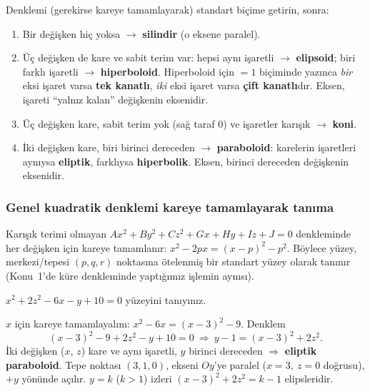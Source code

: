 \begin{teorem}
Denklemi (gerekirse kareye tamamlayarak) standart biçime getirin, sonra:
\begin{enumerate}
  \item Bir değişken hiç yoksa $\to$ \textbf{silindir} (o eksene paralel).
  \item Üç değişken de kare ve sabit terim var: hepsi aynı işaretli $\to$ \textbf{elipsoid}; biri farklı işaretli $\to$ \textbf{hiperboloid}. Hiperboloid için $=1$ biçiminde yazınca \emph{bir} eksi işaret varsa \textbf{tek kanatlı}, \emph{iki} eksi işaret varsa \textbf{çift kanatlı}dır. Eksen, işareti ``yalnız kalan'' değişkenin eksenidir.
  \item Üç değişken kare, sabit terim yok (sağ taraf $0$) ve işaretler karışık $\to$ \textbf{koni}.
  \item İki değişken kare, biri birinci dereceden $\to$ \textbf{paraboloid}: karelerin işaretleri aynıysa \textbf{eliptik}, farklıysa \textbf{hiperbolik}. Eksen, birinci dereceden değişkenin eksenidir.
\end{enumerate}
\end{teorem}

\subsubsection{Genel kuadratik denklemi kareye tamamlayarak tanıma}

\begin{bilgi}
Karışık terimi olmayan $Ax^2+By^2+Cz^2+Gx+Hy+Iz+J=0$ denkleminde her değişken için kareye tamamlanır: $x^2-2px=(x-p)^2-p^2$. Böylece yüzey, merkezi/tepesi $(p,q,r)$ noktasına ötelenmiş bir standart yüzey olarak tanınır (Konu~1'de küre denkleminde yaptığımız işlemin aynısı).
\end{bilgi}

\begin{soru}
$x^2+2z^2-6x-y+10=0$ yüzeyini tanıyınız.
\end{soru}
\begin{cevap}
$x$ için kareye tamamlayalım: $x^2-6x=(x-3)^2-9$. Denklem
\[ (x-3)^2-9+2z^2-y+10=0\ \Longrightarrow\ y-1=(x-3)^2+2z^2 . \]
İki değişken ($x$, $z$) kare ve aynı işaretli, $y$ birinci dereceden $\Rightarrow$ \textbf{eliptik paraboloid}. Tepe noktası $(3,1,0)$, ekseni $Oy$'ye paralel ($x=3,\ z=0$ doğrusu), $+y$ yönünde açılır. $y=k$ ($k>1$) izleri $(x-3)^2+2z^2=k-1$ elipsleridir.
\end{cevap}

